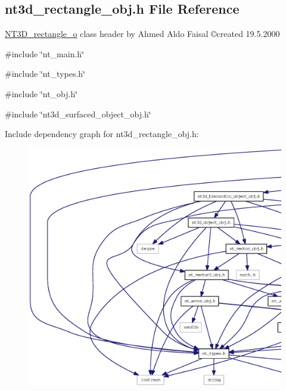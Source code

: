\subsection{nt3d\_\-rectangle\_\-obj.h File Reference}
\label{nt3d__rectangle__obj_8h}



\begin{DoxyItemize}
\item \hyperlink{class_n_t3_d__rectangle__o}{NT3D\_\-rectangle\_\-o} class header by Ahmed Aldo Faisal \copyright created 19.5.2000 
\end{DoxyItemize} 


{\ttfamily \#include \char`\"{}nt\_\-main.h\char`\"{}}\par
{\ttfamily \#include \char`\"{}nt\_\-types.h\char`\"{}}\par
{\ttfamily \#include \char`\"{}nt\_\-obj.h\char`\"{}}\par
{\ttfamily \#include \char`\"{}nt3d\_\-surfaced\_\-object\_\-obj.h\char`\"{}}\par
Include dependency graph for nt3d\_\-rectangle\_\-obj.h:
\nopagebreak
\begin{figure}[H]
\begin{center}
\leavevmode
\includegraphics[width=400pt]{nt3d__rectangle__obj_8h__incl}
\end{center}
\end{figure}

